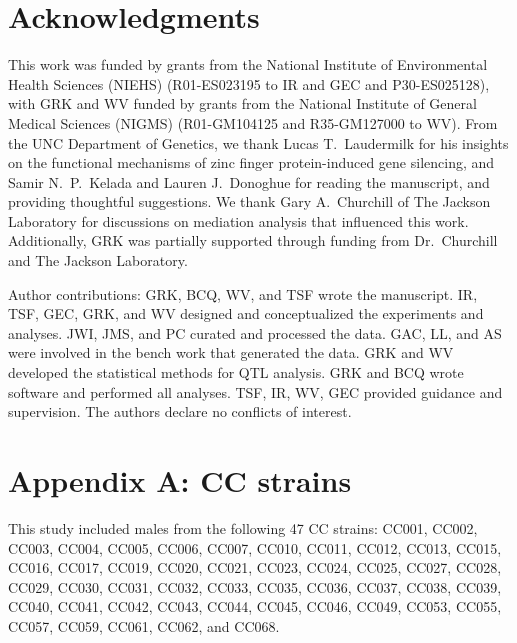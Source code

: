 \documentclass[9pt,twocolumn,twoside]{gsajnl}
\begin{document}

\section{Acknowledgments}
This work was funded by grants from the National Institute of Environmental Health Sciences (NIEHS) (R01-ES023195 to IR and GEC and P30-ES025128), with GRK and WV funded by grants from the National Institute of General Medical Sciences (NIGMS) (R01-GM104125 and R35-GM127000 to WV). From the UNC Department of Genetics, we thank Lucas T.\ Laudermilk for his insights on the functional mechanisms of zinc finger protein-induced gene silencing, and Samir N.\ P.\ Kelada and Lauren J.\ Donoghue for reading the manuscript, and providing thoughtful suggestions. We thank Gary A.\ Churchill of The Jackson Laboratory for discussions on mediation analysis that influenced this work. Additionally, GRK was partially supported through funding from Dr.\ Churchill and The Jackson Laboratory.

Author contributions: GRK, BCQ, WV, and TSF wrote the manuscript. IR, TSF, GEC, GRK, and WV designed and conceptualized the experiments and analyses. JWI, JMS, and PC curated and processed the data. GAC, LL, and AS were involved in the bench work that generated the data. GRK and WV developed the statistical methods for QTL analysis. GRK and BCQ wrote software and performed all analyses. TSF, IR, WV, GEC provided guidance and supervision. The authors declare no conflicts of interest.



\clearpage

\section{Appendix A: CC strains}

This study included males from the following 47 CC strains: CC001, CC002, CC003, CC004, CC005, CC006, CC007, CC010, CC011, CC012, CC013, CC015, CC016, CC017, CC019, CC020, CC021, CC023, CC024, CC025, CC027, CC028, CC029, CC030, CC031, CC032, CC033, CC035, CC036, CC037, CC038, CC039, CC040, CC041, CC042, CC043, CC044, CC045, CC046, CC049, CC053, CC055, CC057, CC059, CC061, CC062, and CC068.
\end{document}
